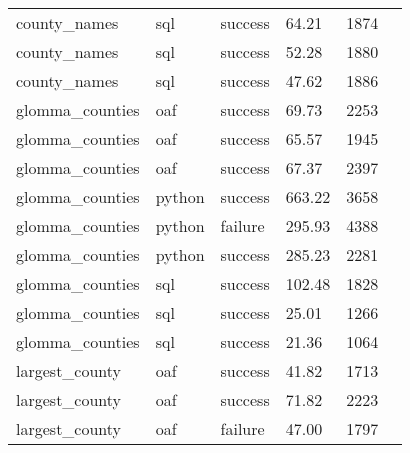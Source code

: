 \begin{longtable}{lp{1.8cm}p{1.8cm}p{1.8cm}p{1.8cm}p{1.8cm}}
    county\_names              & sql                          & success          & 64.21                         & 1874            \\
    county\_names              & sql                          & success          & 52.28                         & 1880            \\
    county\_names              & sql                          & success          & 47.62                         & 1886            \\
    glomma\_counties           & oaf                          & success          & 69.73                         & 2253            \\
    glomma\_counties           & oaf                          & success          & 65.57                         & 1945            \\
    glomma\_counties           & oaf                          & success          & 67.37                         & 2397            \\
    glomma\_counties           & python                       & success          & 663.22                        & 3658            \\
    glomma\_counties           & python                       & failure          & 295.93                        & 4388            \\
    glomma\_counties           & python                       & success          & 285.23                        & 2281            \\
    glomma\_counties           & sql                          & success          & 102.48                        & 1828            \\
    glomma\_counties           & sql                          & success          & 25.01                         & 1266            \\
    glomma\_counties           & sql                          & success          & 21.36                         & 1064            \\
    largest\_county            & oaf                          & success          & 41.82                         & 1713            \\
    largest\_county            & oaf                          & success          & 71.82                         & 2223            \\
    largest\_county            & oaf                          & failure          & 47.00                         & 1797            \\

\end{longtable}

